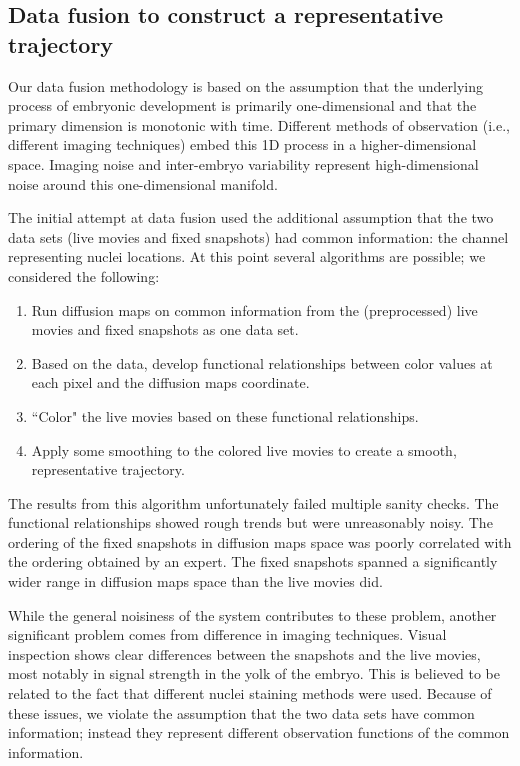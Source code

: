 \documentclass[12pt]{article}
\begin{document}
\subsection{Data fusion to construct a representative trajectory}

Our data fusion methodology is based on the assumption that the underlying process of embryonic development is primarily one-dimensional and that the primary dimension is monotonic with time. Different methods of observation (i.e., different imaging techniques) embed this 1D process in a higher-dimensional space. Imaging noise and inter-embryo variability represent high-dimensional noise around this one-dimensional manifold. \vspace{1mm}

The initial attempt at data fusion used the additional assumption that the two data sets (live movies and fixed snapshots) had common information: the channel representing nuclei locations. At this point several algorithms are possible; we considered the following:

\begin{enumerate}
\item Run diffusion maps on common information from the (preprocessed) live movies and fixed snapshots as one data set.
\item Based on the data, develop functional relationships between color values at each pixel and the diffusion maps coordinate.
\item ``Color" the live movies based on these functional relationships.
\item Apply some smoothing to the colored live movies to create a smooth, representative trajectory.
\end{enumerate}

The results from this algorithm unfortunately failed multiple sanity checks. The functional relationships showed rough trends but were unreasonably noisy. The ordering of the fixed snapshots in diffusion maps space was poorly correlated with the ordering obtained by an expert. The fixed snapshots spanned a significantly wider range in diffusion maps space than the live movies did. \vspace{1mm}

While the general noisiness of the system contributes to these problem, another significant problem comes from difference in imaging techniques. Visual inspection shows clear differences between the snapshots and the live movies, most notably in signal strength in the yolk of the embryo. This is believed to be related to the fact that different nuclei staining methods were used. Because of these issues, we violate the assumption that the two data sets have common information; instead they represent different observation functions of the common information. \vspace{1mm}
\end{document}
